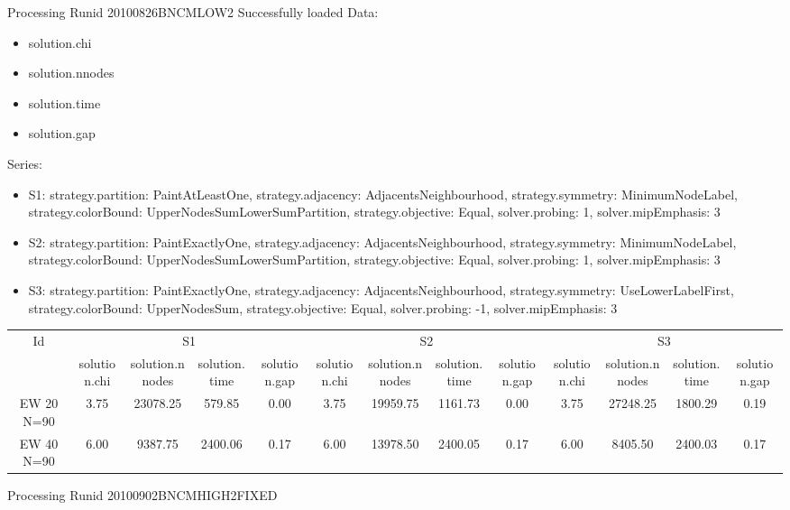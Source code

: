 \documentclass[landscape, 12pt]{report}
\begin{document}
	Processing Runid 20100826BNCMLOW2
 Successfully loaded
Data:
\begin{itemize}
\item solution.chi
\item solution.nnodes
\item solution.time
\item solution.gap
\end{itemize}
Series:
\begin{itemize}
\item S1: strategy.partition: PaintAtLeastOne, strategy.adjacency: AdjacentsNeighbourhood, strategy.symmetry: MinimumNodeLabel, strategy.colorBound: UpperNodesSumLowerSumPartition, strategy.objective: Equal, solver.probing: 1, solver.mipEmphasis: 3
\item S2: strategy.partition: PaintExactlyOne, strategy.adjacency: AdjacentsNeighbourhood, strategy.symmetry: MinimumNodeLabel, strategy.colorBound: UpperNodesSumLowerSumPartition, strategy.objective: Equal, solver.probing: 1, solver.mipEmphasis: 3
\item S3: strategy.partition: PaintExactlyOne, strategy.adjacency: AdjacentsNeighbourhood, strategy.symmetry: UseLowerLabelFirst, strategy.colorBound: UpperNodesSum, strategy.objective: Equal, solver.probing: -1, solver.mipEmphasis: 3
\end{itemize}
\begin{tabular}{|c|cccc|cccc|cccc|}
\hline
\multicolumn{1}{|c|}{Id} & \multicolumn{4}{|c|}{S1} & \multicolumn{4}{|c|}{S2} & \multicolumn{4}{|c|}{S3}
\\
 & solution.chi & solution.nnodes & solution.time & solution.gap & solution.chi & solution.nnodes & solution.time & solution.gap & solution.chi & solution.nnodes & solution.time & solution.gap
\\
\hline
EW 20 N=90 & 3.75 & 23078.25 & 579.85 & 0.00 & 3.75 & 19959.75 & 1161.73 & 0.00 & 3.75 & 27248.25 & 1800.29 & 0.19
\\
EW 40 N=90 & 6.00 & 9387.75 & 2400.06 & 0.17 & 6.00 & 13978.50 & 2400.05 & 0.17 & 6.00 & 8405.50 & 2400.03 & 0.17
\\
\hline 
 \end{tabular}
 
 
 
Processing Runid 20100902BNCMHIGH2FIXED
\end{document}

